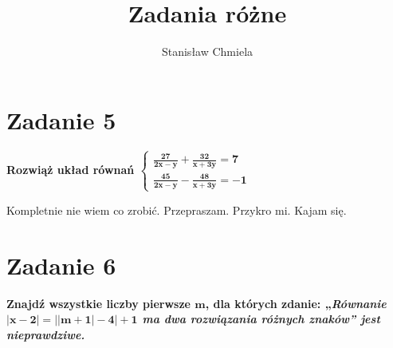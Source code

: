 \documentclass [a4paper, 10pt]{article}
\author{Stanisław Chmiela}
\title{Zadania różne}
\begin{document}
\maketitle
\section*{Zadanie 5}
\bf Rozwiąż układ równań $\begin{cases} \mathbf{\frac{27}{2x-y} + \frac{32}{x+3y} = 7}\\\mathbf{\frac{45}{2x-y} - \frac{48}{x+3y} = -1}\end{cases}$

\rm Kompletnie nie wiem co zrobić. Przepraszam. Przykro mi. Kajam się.
\section*{Zadanie 6}
\bf Znajdź wszystkie liczby pierwsze $\mathbf{m}$, dla których zdanie: „\it{\bf Równanie $\mathbf{|x-2| = \left||m+1|-4\right|+1}$ \bf ma dwa rozwiązania różnych znaków}\bf” jest nieprawdziwe.
\end{document}
